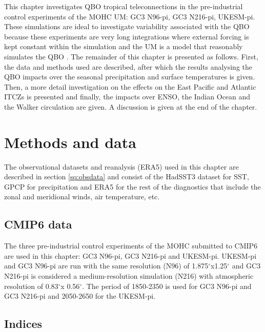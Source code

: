 This chapter investigates QBO tropical teleconnections in the pre-industrial control experiments of the MOHC UM: GC3 N96-pi, GC3 N216-pi, UKESM-pi. These simulations are ideal to investigate variability associated with the QBO because these experiments are very long integrations where external forcing is kept constant within the simulation and the UM is a model that reasonably simulates the QBO \citep{richter2020}. 
The remainder of this chapter is presented as follows. 
First, the data and methods used are described, after which the results analysing the QBO impacts over the seasonal precipitation and surface temperatures  is given. 
Then, a more detail investigation on the effects on the East Pacific and Atlantic ITCZs is presented and finally, the impacts over ENSO, the Indian Ocean and the Walker circulation are given. 
A discussion is given at the end of the chapter.





\section{Methods and data}

The observational datasets and reanalysis (ERA5) used in this chapter are described in section \ref{sq:obsdata} and consist of the HadSST3 dataset for SST, GPCP for precipitation and ERA5 for the rest of the diagnostics that include the zonal and meridional winds, air temperature, etc.

\subsection{CMIP6 data}

The three pre-industrial control experiments of the MOHC submitted to CMIP6 are used in this chapter: GC3 N96-pi, GC3 N216-pi and UKESM-pi. UKESM-pi and GC3 N96-pi are run with the same resolution (N96) of 1.875$^\circ$x1.25$^\circ$ and GC3 N216-pi is considered a medium-resolution simulation (N216) with atmospheric resolution of 0.83$^\circ$x 0.56$^\circ$. The period of 1850-2350 is used for GC3 N96-pi and GC3 N216-pi and 2050-2650 for the UKESM-pi. 


\subsection{Indices}

